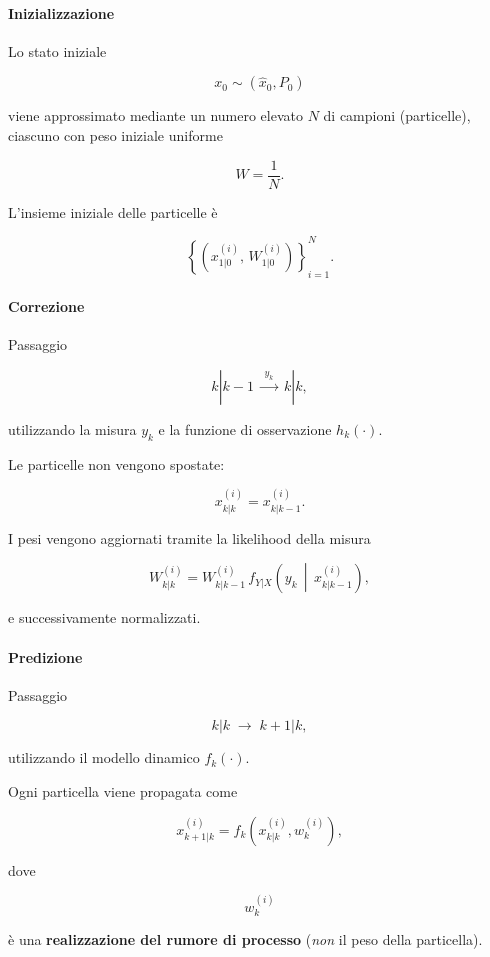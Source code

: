 \documentclass[11pt,a4paper]{article}
\begin{document}
\paragraph{Inizializzazione}

Lo stato iniziale

\[
x_0\sim(\hat{x}_0,P_0)
\]

viene approssimato mediante un numero elevato \(N\) di campioni
(particelle), ciascuno con peso iniziale uniforme

\[
W=\frac1N.
\]

L'insieme iniziale delle particelle è

\[
\left\{
\left(x^{(i)}_{1|0},\,W^{(i)}_{1|0}\right)
\right\}_{i=1}^{N}.
\]

\bigskip

\paragraph{Correzione}

Passaggio

\[
k|k-1
\;\xrightarrow{\;y_k\;}\;
k|k,
\]

utilizzando la misura \(y_k\) e la funzione di osservazione
\(h_k(\cdot)\).

Le particelle non vengono spostate:

\[
x^{(i)}_{k|k}
=
x^{(i)}_{k|k-1}.
\]

I pesi vengono aggiornati tramite la likelihood della misura

\[
W^{(i)}_{k|k}
=
W^{(i)}_{k|k-1}\,
f_{Y|X}\!\left(
y_k\,\middle|\,x^{(i)}_{k|k-1}
\right),
\]

e successivamente normalizzati.

\bigskip

\paragraph{Predizione}

Passaggio

\[
k|k
\;\longrightarrow\;
k+1|k,
\]

utilizzando il modello dinamico \(f_k(\cdot)\).

Ogni particella viene propagata come

\[
x^{(i)}_{k+1|k}
=
f_k\!\left(
x^{(i)}_{k|k},
w^{(i)}_k
\right),
\]

dove

\[
w^{(i)}_k
\]

è una \textbf{realizzazione del rumore di processo}
(\emph{non} il peso della particella).
\end{document}
